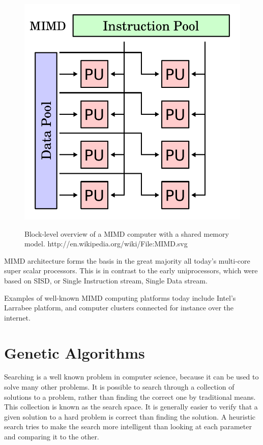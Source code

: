\begin{figure}[H]
\begin{center}
    \includegraphics[width=\textwidth/2]{fig/mimd-block-diagram.pdf}
    \label{figure:mimd-block-diagram}
    \caption[
    Block-level overview of a MIMD computer with a shared memory model
    ]{
    Block-level overview of a MIMD computer with a shared memory model.
   http://en.wikipedia.org/wiki/File:MIMD.svg 
   }
\end{center}
\end{figure}


MIMD architecture forms the basis in the great majority all today’s multi-core super scalar processors.
This is in contrast to the early uniprocessors, which were based on SISD, or Single Instruction stream, Single Data stream. 


Examples of well-known MIMD computing platforms today include Intel's Larrabee platform, and computer clusters connected for instance over the internet.

\section{Genetic Algorithms}
\label{ga-algorithms}

Searching is a well known problem in computer science, because it can be used to solve many other problems.
It is possible to search through a collection of solutions to a problem, rather than finding the correct one by traditional means.
This collection is known as the \Gls{search space}.
It is generally easier to verify that a given solution to a hard problem is correct than finding the solution.
A heuristic search tries to make the search more intelligent than looking at each parameter and comparing it to the other.

